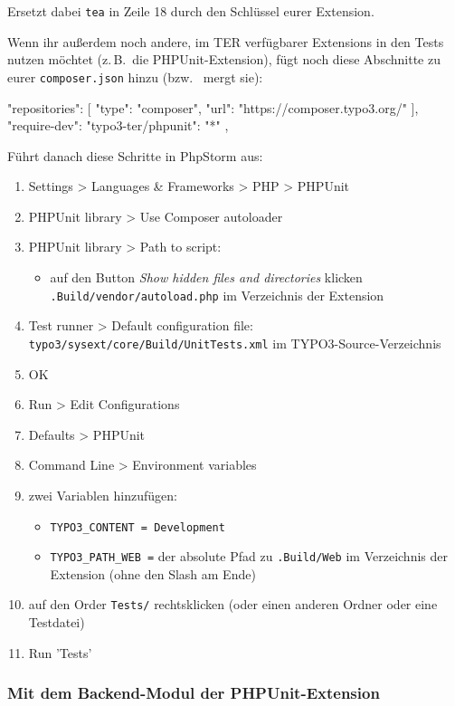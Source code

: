 \documentclass[a4paper,10pt,headsepline]{scrartcl}
\begin{document}
Ersetzt dabei \texttt{tea} in Zeile 18 durch den Schlüssel eurer Extension.

Wenn ihr außerdem noch andere, im TER verfügbarer Extensions in den Tests nutzen möchtet (z.\,B.~die PHPUnit-Extension), fügt noch diese Abschnitte zu eurer \texttt{composer.json} hinzu (bzw.~ mergt sie):

\begin{jsoncode}
"repositories": [
{
  "type": "composer",
  "url": "https://composer.typo3.org/"
}
],
"require-dev": {
  "typo3-ter/phpunit": "*"
},
\end{jsoncode}

Führt danach diese Schritte in PhpStorm aus:
\begin{enumerate}
  \item Settings > Languages \& Frameworks > PHP > PHPUnit
  \item PHPUnit library > Use Composer autoloader
  \item PHPUnit library > Path to script:
    \begin{itemize}
      \item auf den Button \emph{Show hidden files and directories} klicken
      \texttt{.Build/vendor/autoload.php} im Verzeichnis der Extension
    \end{itemize}
  \item Test runner > Default configuration file: \texttt{typo3/sysext/core/Build/UnitTests.xml} im TYPO3-Source-Verzeichnis
  \item OK
  \item Run > Edit Configurations
  \item Defaults > PHPUnit
  \item Command Line > Environment variables
  \item zwei Variablen hinzufügen:
    \begin{itemize}
      \item \texttt{TYPO3\_CONTENT = Development}
      \item \texttt{TYPO3\_PATH\_WEB =} der absolute Pfad zu \texttt{.Build/Web} im Verzeichnis der Extension (ohne den Slash am Ende)
    \end{itemize}
  \item auf den Order \texttt{Tests/} rechtsklicken (oder einen anderen Ordner oder eine Testdatei)
  \item Run 'Tests'
\end{enumerate}



\subsubsection{Mit dem Backend-Modul der PHPUnit-Extension}
\end{document}
